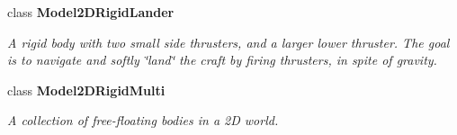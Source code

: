 \begin{CompactItemize}
class {\bf Model2DRigid\-Lander}
\begin{CompactList}\small\item\em A rigid body with two small side thrusters, and a larger lower thruster. The goal is to navigate and softly \char`\"{}land\char`\"{} the craft by firing thrusters, in spite of gravity.\item\end{CompactList}\item 
class {\bf Model2DRigid\-Multi}
\begin{CompactList}\small\item\em A collection of free-floating bodies in a 2D world.\item\end{CompactList}\end{CompactItemize}
